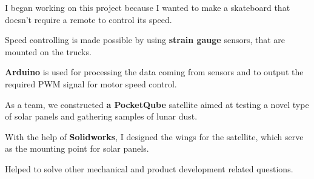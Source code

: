 \documentclass[letterpaper]{deedy-resume} %
\begin{document}
\begin{minipage}[t]{0.66\textwidth}
\begin{tightitemize}
  \item I began working on this project because I wanted to make a skateboard that doesn't require a remote to control its speed.
  \item Speed controlling is made possible by using \textbf{strain gauge} sensors, that are mounted on the trucks.
  \item \textbf{Arduino} is used for processing the data coming from sensors and to output the required PWM signal for motor speed control.
\end{tightitemize}

\sectionspace %



\begin{tightitemize}
\item As a team, we constructed \textbf{a PocketQube} satellite aimed at testing a novel type of solar panels and gathering samples of lunar dust.
\item With the help of \textbf{Solidworks}, I designed the wings for the satellite, which serve as the mounting point for solar panels.
\item Helped to solve other mechanical and product development related questions.
\end{tightitemize}


%


\end{minipage}
\end{document}
